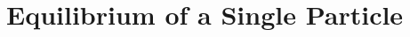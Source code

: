 \documentclass[12pt]{article}
\begin{document}

\section{Equilibrium of a Single Particle}
\end{document}
